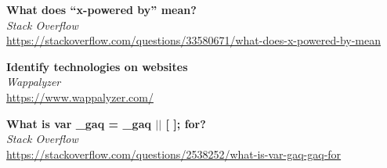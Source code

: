 \documentclass[10pt,a4paper]{article}
\begin{document}
\begin{thebibliography}{9}
	\textbf{What does “x-powered by” mean?}\\
	\textit{Stack Overflow}\\
	\url{https://stackoverflow.com/questions/33580671/what-does-x-powered-by-mean}

	\textbf{Identify technologies on websites}\\
	\textit{Wappalyzer}\\
	\url{https://www.wappalyzer.com/}

	\textbf{What is var \_gaq = \_gaq $\vert \vert$ [ ]; for?}\\
	\textit{Stack Overflow}\\
	\url{https://stackoverflow.com/questions/2538252/what-is-var-gaq-gaq-for}

\end{thebibliography}
\end{document}
